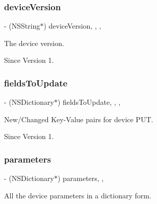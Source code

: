 \subsubsection{\texorpdfstring{device\+Version}{deviceVersion}}
{\footnotesize\ttfamily -\/ (N\+S\+String$\ast$) device\+Version\hspace{0.3cm}{\ttfamily [read]}, {\ttfamily [write]}, {\ttfamily [nonatomic]}, {\ttfamily [assign]}}



The device version. 

\begin{DoxySince}{Since}
Version 1. 
\end{DoxySince}
\hypertarget{class_x_i_device_info_aaa3e21f185171a65e7976c05209ff3cd}{}\label{class_x_i_device_info_aaa3e21f185171a65e7976c05209ff3cd} 
\subsubsection{\texorpdfstring{fields\+To\+Update}{fieldsToUpdate}}
{\footnotesize\ttfamily -\/ (N\+S\+Dictionary$\ast$) fields\+To\+Update\hspace{0.3cm}{\ttfamily [read]}, {\ttfamily [write]}, {\ttfamily [nonatomic]}, {\ttfamily [assign]}}



New/\+Changed Key-\/\+Value pairs for device P\+UT. 

\begin{DoxySince}{Since}
Version 1. 
\end{DoxySince}
\hypertarget{class_x_i_device_info_a9ffa8d12d59d023b4e84972d2ab5090b}{}\label{class_x_i_device_info_a9ffa8d12d59d023b4e84972d2ab5090b} 
\subsubsection{\texorpdfstring{parameters}{parameters}}
{\footnotesize\ttfamily -\/ (N\+S\+Dictionary$\ast$) parameters\hspace{0.3cm}{\ttfamily [read]}, {\ttfamily [nonatomic]}, {\ttfamily [assign]}}



All the device parameters in a dictionary form. 

